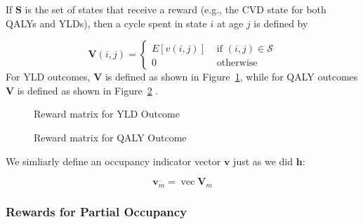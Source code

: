 \documentclass[
]{agujournal2019}
\begin{document}
If \(\mathbf{S}\) is the set of states that receive a reward (e.g., the
CVD state for both QALYs and YLDs), then a cycle spent in state \(i\) at
age \(j\) is defined by

\[
\mathbf{V}(i, j)= \begin{cases}E\left[v(i, j)\right] & \text { if }(i, j) \in \mathcal{S} \\ 0 & \text { otherwise }\end{cases}
\] For YLD outcomes, \(\mathbf{V}\) is defined as shown in
Figure~\ref{fig-V-yld}, while for QALY outcomes \(\mathbf{V}\) is
defined as shown in Figure~\ref{fig-V-qaly} .

\begin{figure}


\caption{\label{fig-V-yld}Reward matrix for YLD Outcome}

\end{figure}%

\begin{figure}


\caption{\label{fig-V-qaly}Reward matrix  for QALY Outcome}

\end{figure}%

We simliarly define an occupancy indicator vector \(\mathbf{v}\) just as
we did \(\mathbf{h}\):

\[
\mathbf{v}_{m}=\operatorname{vec} \mathbf{V}_{m}
\]

\subsubsection{Rewards for Partial
Occupancy}\label{rewards-for-partial-occupancy}
\end{document}
